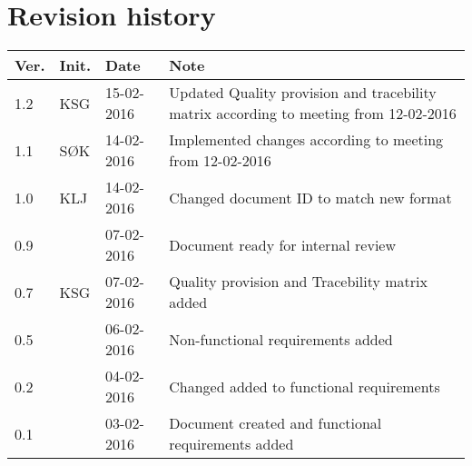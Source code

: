 \label{chp_revisionHistory}
\chapter{Revision history}

\begin{tabular}{b{1cm} b{1cm} b{2cm} b{8cm}}
    \textbf{Ver.} & \textbf{Init.} & \textbf{Date} & \textbf{Note} \\
    \hline
    1.2 & KSG & 15-02-2016 & Updated Quality provision and tracebility matrix according to meeting from 12-02-2016 \\ 
    1.1 & SØK & 14-02-2016 & Implemented changes according to meeting from 12-02-2016 \\ 
    1.0 & KLJ & 14-02-2016 & Changed document ID to match new format \\
    0.9 & & 07-02-2016 & Document ready for internal review \\
    0.7 & KSG & 07-02-2016 & Quality provision and Tracebility matrix added \\
    0.5 & & 06-02-2016 & Non-functional requirements added \\
    0.2 & & 04-02-2016 & Changed added to functional requirements \\
    0.1 & & 03-02-2016 & Document created and functional requirements added  \\
\end{tabular}